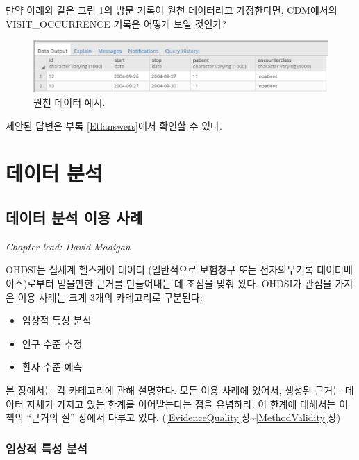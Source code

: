 \documentclass[10.5pt]{book}
\providecommand{\tightlist}{%
  \setlength{\itemsep}{0pt}\setlength{\parskip}{0pt}}
\theoremstyle{definition}
\theoremstyle{definition}
\theoremstyle{definition}
\theoremstyle{remark}
\begin{document}
만약 아래와 같은 그림 \ref{fig:exerciseSourceData}의 방문 기록이 원천
데이터라고 가정한다면, CDM에서의 VISIT\_OCCURRENCE 기록은 어떻게 보일
것인가?

\begin{figure}

{\centering \includegraphics[width=1\linewidth]{images/ExtractTransformLoad/exerciseSourceData} 

}

\caption{원천 데이터 예시.}\label{fig:exerciseSourceData}
\end{figure}

제안된 답변은 부록 \ref{Etlanswers}에서 확인할 수 있다.

\part{데이터 분석}\label{part--}

\chapter{데이터 분석 이용 사례}\label{DataAnalyticsUseCases}

\emph{Chapter lead: David Madigan}

OHDSI는 실세계 헬스케어 데이터 (일반적으로 보험청구 또는 전자의무기록
데이터베이스)로부터 믿을만한 근거를 만들어내는 데 초점을 맞춰 왔다.
OHDSI가 관심을 가져온 이용 사례는 크게 3개의 카테고리로 구분된다:

\begin{itemize}
\tightlist
\item
  임상적 특성 분석
\item
  인구 수준 추정
\item
  환자 수준 예측
\end{itemize}

본 장에서는 각 카테고리에 관해 설명한다. 모든 이용 사례에 있어서, 생성된
근거는 데이터 자체가 가지고 있는 한계를 이어받는다는 점을 유념하라. 이
한계에 대해서는 이 책의 ``근거의 질'' 장에서 다루고 있다.
(\ref{EvidenceQuality}장\textasciitilde{}\ref{MethodValidity}장)

\section{임상적 특성 분석}\label{--}
\end{document}
